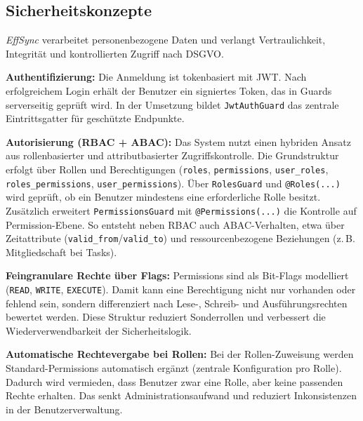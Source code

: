 \subsection{Sicherheitskonzepte}
\label{sec:sicherheitskonzepte}

\textit{EffSync} verarbeitet personenbezogene Daten und verlangt Vertraulichkeit, Integrität und kontrollierten Zugriff nach DSGVO\cite{dsgvo2016}.

\vspace{0.5cm}
\noindent\textbf{Authentifizierung:} Die Anmeldung ist tokenbasiert mit JWT\cite{rfc7519_jwt}. Nach erfolgreichem Login erhält der Benutzer ein signiertes Token, das in Guards serverseitig geprüft wird\cite{nestjs_authentication}\cite{passportjs_docs}. In der Umsetzung bildet \texttt{JwtAuthGuard} das zentrale Eintrittsgatter für geschützte Endpunkte.

\vspace{0.5cm}
\noindent\textbf{Autorisierung (RBAC + ABAC):} Das System nutzt einen hybriden Ansatz aus rollenbasierter und attributbasierter Zugriffskontrolle. Die Grundstruktur erfolgt über Rollen und Berechtigungen (\texttt{roles}, \texttt{permissions}, \texttt{user\_roles}, \texttt{roles\_permissions}, \texttt{user\_permissions}). Über \texttt{RolesGuard} und \texttt{@Roles(...)} wird geprüft, ob ein Benutzer mindestens eine erforderliche Rolle besitzt. Zusätzlich erweitert \texttt{PermissionsGuard} mit \texttt{@Permissions(...)} die Kontrolle auf Permission-Ebene. So entsteht neben RBAC auch ABAC-Verhalten, etwa über Zeitattribute (\texttt{valid\_from}/\texttt{valid\_to}) und ressourcenbezogene Beziehungen (z.\,B. Mitgliedschaft bei Tasks).

\vspace{0.5cm}
\noindent\textbf{Feingranulare Rechte über Flags:} Permissions sind als Bit-Flags modelliert (\texttt{READ}, \texttt{WRITE}, \texttt{EXECUTE}). Damit kann eine Berechtigung nicht nur vorhanden oder fehlend sein, sondern differenziert nach Lese-, Schreib- und Ausführungsrechten bewertet werden. Diese Struktur reduziert Sonderrollen und verbessert die Wiederverwendbarkeit der Sicherheitslogik.

\vspace{0.5cm}
\noindent\textbf{Automatische Rechtevergabe bei Rollen:} Bei der Rollen-Zuweisung werden Standard-Permissions automatisch ergänzt (zentrale Konfiguration pro Rolle). Dadurch wird vermieden, dass Benutzer zwar eine Rolle, aber keine passenden Rechte erhalten. Das senkt Administrationsaufwand und reduziert Inkonsistenzen in der Benutzerverwaltung.

